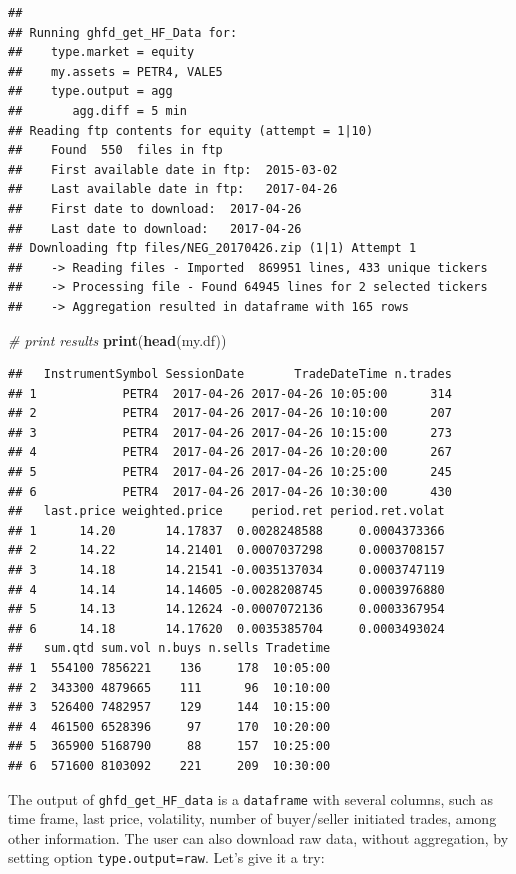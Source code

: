 \documentclass[11pt,]{book}
\newenvironment{Shaded}{\begin{snugshade}}{\end{snugshade}}
\newcommand{\KeywordTok}[1]{\textcolor[rgb]{0.27,0.27,0.27}{\textbf{#1}}}
\newcommand{\CommentTok}[1]{\textcolor[rgb]{0.56,0.35,0.01}{\textit{#1}}}
\newcommand{\NormalTok}[1]{#1}
\begin{document}
\begin{verbatim}
## 
## Running ghfd_get_HF_Data for:
##    type.market = equity
##    my.assets = PETR4, VALE5
##    type.output = agg
##       agg.diff = 5 min
## Reading ftp contents for equity (attempt = 1|10)
##    Found  550  files in ftp
##    First available date in ftp:  2015-03-02
##    Last available date in ftp:   2017-04-26
##    First date to download:  2017-04-26
##    Last date to download:   2017-04-26
## Downloading ftp files/NEG_20170426.zip (1|1) Attempt 1
##    -> Reading files - Imported  869951 lines, 433 unique tickers
##    -> Processing file - Found 64945 lines for 2 selected tickers
##    -> Aggregation resulted in dataframe with 165 rows
\end{verbatim}

\begin{Shaded}
\begin{Highlighting}[]
\CommentTok{# print results}
\KeywordTok{print}\NormalTok{(}\KeywordTok{head}\NormalTok{(my.df))}
\end{Highlighting}
\end{Shaded}

\begin{verbatim}
##   InstrumentSymbol SessionDate       TradeDateTime n.trades
## 1            PETR4  2017-04-26 2017-04-26 10:05:00      314
## 2            PETR4  2017-04-26 2017-04-26 10:10:00      207
## 3            PETR4  2017-04-26 2017-04-26 10:15:00      273
## 4            PETR4  2017-04-26 2017-04-26 10:20:00      267
## 5            PETR4  2017-04-26 2017-04-26 10:25:00      245
## 6            PETR4  2017-04-26 2017-04-26 10:30:00      430
##   last.price weighted.price    period.ret period.ret.volat
## 1      14.20       14.17837  0.0028248588     0.0004373366
## 2      14.22       14.21401  0.0007037298     0.0003708157
## 3      14.18       14.21541 -0.0035137034     0.0003747119
## 4      14.14       14.14605 -0.0028208745     0.0003976880
## 5      14.13       14.12624 -0.0007072136     0.0003367954
## 6      14.18       14.17620  0.0035385704     0.0003493024
##   sum.qtd sum.vol n.buys n.sells Tradetime
## 1  554100 7856221    136     178  10:05:00
## 2  343300 4879665    111      96  10:10:00
## 3  526400 7482957    129     144  10:15:00
## 4  461500 6528396     97     170  10:20:00
## 5  365900 5168790     88     157  10:25:00
## 6  571600 8103092    221     209  10:30:00
\end{verbatim}

The output of \texttt{ghfd\_get\_HF\_data} is a \texttt{dataframe} with
several columns, such as time frame, last price, volatility, number of
buyer/seller initiated trades, among other information. The user can
also download raw data, without aggregation, by setting option
\texttt{type.output=\textquotesingle{}raw\textquotesingle{}}. Let's give
it a try:
\end{document}

